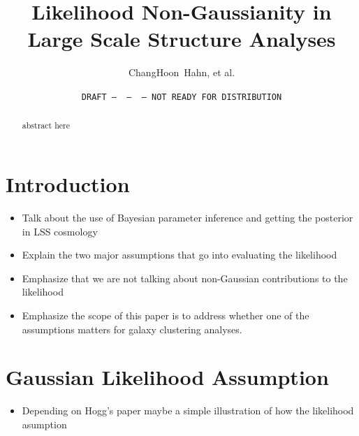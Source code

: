 \documentclass[12pt, letterpaper, preprint]{aastex}
\begin{document}
\sloppy\sloppypar\frenchspacing 

\title{Likelihood Non-Gaussianity in Large Scale Structure Analyses}
\date{\texttt{DRAFT~---~\githash~---~\gitdate~---~NOT READY FOR DISTRIBUTION}}
\author{ChangHoon~Hahn, et al.} %

\begin{abstract}
    abstract here 
\end{abstract}


\section{Introduction}
\begin{itemize}
    \item Talk about the use of Bayesian parameter inference and getting the posterior in LSS cosmology 
    \item Explain the two major assumptions that go into evaluating the likelihood
    \item Emphasize that we are not talking about non-Gaussian contributions to the likelihood
    \item Emphasize the scope of this paper is to address whether one of the assumptions matters for 
        galaxy clustering analyses. 
\end{itemize}


\section{Gaussian Likelihood Assumption} \label{sec:gaussass} 
\begin{itemize}
    \item Depending on Hogg's paper maybe a simple illustration of how the likelihood asumption 
\end{itemize}
\end{document}

